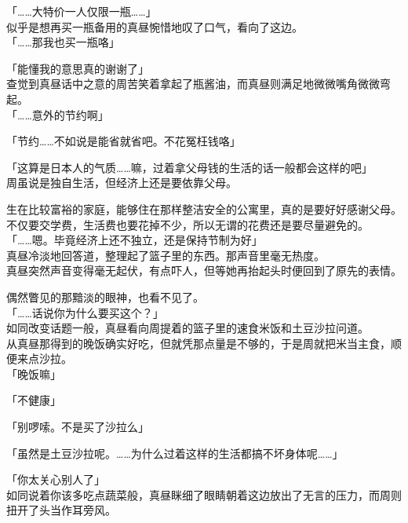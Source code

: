 「……大特价一人仅限一瓶……」\\

似乎是想再买一瓶备用的真昼惋惜地叹了口气，看向了这边。\\

「……那我也买一瓶咯」

「能懂我的意思真的谢谢了」\\

查觉到真昼话中之意的周苦笑着拿起了瓶酱油，而真昼则满足地微微嘴角微微弯起。\\

「……意外的节约啊」

「节约……不如说是能省就省吧。不花冤枉钱咯」

「这算是日本人的气质……嘛，过着拿父母钱的生活的话一般都会这样的吧」\\

周虽说是独自生活，但经济上还是要依靠父母。

生在比较富裕的家庭，能够住在那样整洁安全的公寓里，真的是要好好感谢父母。不仅要交学费，生活费也要花掉不少，所以无谓的花费还是要尽量避免的。\\

「……嗯。毕竟经济上还不独立，还是保持节制为好」\\

真昼冷淡地回答道，整理起了篮子里的东西。那声音里毫无热度。\\

真昼突然声音变得毫无起伏，有点吓人，但等她再抬起头时便回到了原先的表情。

偶然瞥见的那黯淡的眼神，也看不见了。\\

「……话说你为什么要买这个？」\\

如同改变话题一般，真昼看向周提着的篮子里的速食米饭和土豆沙拉问道。\\

从真昼那得到的晚饭确实好吃，但就凭那点量是不够的，于是周就把米当主食，顺便来点沙拉。\\

「晚饭嘛」

「不健康」

「别啰嗦。不是买了沙拉么」

「虽然是土豆沙拉呢。……为什么过着这样的生活都搞不坏身体呢……」

「你太关心别人了」\\

如同说着你该多吃点蔬菜般，真昼眯细了眼睛朝着这边放出了无言的压力，而周则扭开了头当作耳旁风。\\

